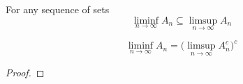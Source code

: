   \begin{lemma}[Monotonicity]
    For any sequence of sets 
    \begin{equation}
      \liminf_{n \to \infty} A_n \subseteq \limsup_{n \to \infty} A_n 
    \end{equation}
  \end{lemma}

  \begin{lemma}[Complements]
    \begin{equation}
      \liminf_{n \to \infty} A_n = \bigg( \limsup_{n \to \infty} A_n^c  \bigg)^c
    \end{equation}
  \end{lemma}
  \begin{proof}
    
  \end{proof}

  \begin{definition}
    
  \end{definition} 

